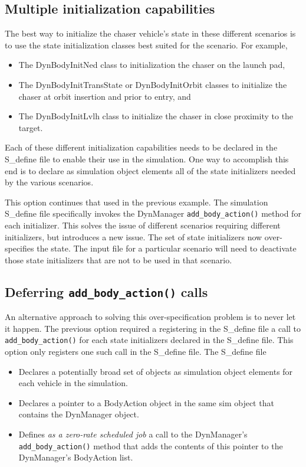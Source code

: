 \subsection{Multiple initialization capabilities}
The best way to initialize the chaser vehicle's state in these different
scenarios is to use the \ModelDesc state initialization classes best suited
for the scenario. For example,
\begin{itemize}
\item The DynBodyInitNed class to initialization the chaser on the launch pad,
\item The DynBodyInitTransState or DynBodyInitOrbit classes to initialize
the chaser at orbit insertion and prior to entry, and
\item The DynBodyInitLvlh class to initialize the chaser in close proximity
to the target.
\end{itemize}
Each of these different initialization capabilities needs to be declared
in the S\_define file to enable their use in the simulation.
One way to accomplish this end is to declare as simulation object
elements all of the state initializers needed by the various scenarios.

This option continues that used in the previous example.
The simulation S\_define file specifically
invokes the DynManager {\tt add\_body\_action()} method for
each initializer. This solves the issue of different scenarios
requiring different initializers, but introduces a new issue.
The set of state initializers now over-specifies the state.
The input file for a particular scenario will need to deactivate
those state initializers that are not to be used in that scenario.

\subsection{Deferring %
  \texorpdfstring{{\tt add\_body\_action()}}{add\_body\_action()} calls}
\label{subsec:recommended_practice}
An alternative approach to solving this over-specification problem is to
never let it happen. The previous option required a registering
in the S\_define file a call to {\tt add\_body\_action()}
for each state initializers declared in the S\_define file.
This option only registers one such call in the S\_define file.
The S\_define file
\begin{itemize}
\item Declares a potentially broad set of \ModelDesc objects as
simulation object elements for each vehicle in the simulation.
\item Declares a pointer to a BodyAction object in the same sim object
that contains the DynManager object.
\item Defines {\em as a zero-rate scheduled job} a call to the DynManager's
{\tt add\_body\_action()} method that adds the contents of this pointer
to the DynManager's BodyAction list.
\end{itemize}

